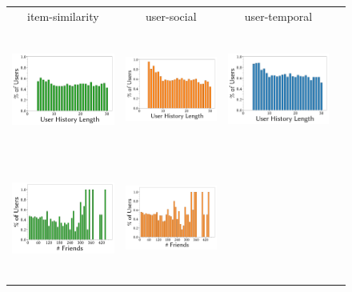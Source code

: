 \begin{figure}[tbh]
  \centering
    \begin{tabular}{c c c c}
      item-similarity & user-social & user-temporal \\
    \includegraphics[height=4cm,width=0.3\linewidth]{figures/epinions_itemSocial_Total_users_length.pdf}
 &
    \includegraphics[height=4cm,width=0.3\linewidth]{figures/epinions_userSocial_Total_users_length.pdf}
  &
    \includegraphics[height=4cm,width=0.3\linewidth]{figures/epinions_temporal_Total_users_length.pdf}\\
    \includegraphics[height=4cm,width=0.3\linewidth]{figures/epinions_itemSocial_Total_users_friend.pdf}
 &
    \includegraphics[height=4cm,width=0.3\linewidth]{figures/epinions_userSocial_Total_users_friend.pdf}

\end{tabular}
\end{figure}
